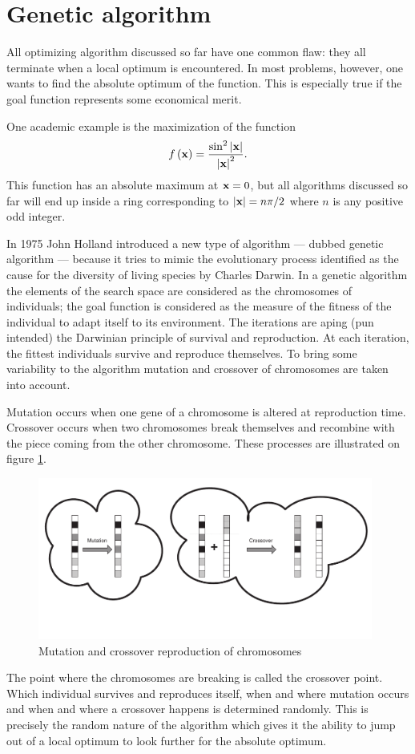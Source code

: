 \documentclass[twoside]{book}
\begin{document}
\section{Genetic algorithm}
All optimizing algorithm discussed so far have one common flaw:
they all terminate when a local optimum is encountered. In most
problems, however, one wants to find the absolute optimum of the
function. This is especially true if the goal function represents
some economical merit.

\noindent One academic example is the maximization of the function
\begin{equation}
\label{eq:geneticCase}
  f\left({\bf x}\right)={ \sin^2\left|{\bf x}\right| \over\left|{\bf
  x}\right|^2}.
\end{equation}
This function has an absolute maximum at ${\bf x}=0$, but all
algorithms discussed so far will end up inside a ring
corresponding to $\left|{\bf x}\right|=n\pi/2$ where $n$ is any
positive odd integer.

In 1975 John Holland introduced a new type of algorithm --- dubbed
genetic algorithm --- because it tries to mimic the evolutionary
process identified as the cause for the diversity of living
species by Charles Darwin. In a genetic algorithm the elements of
the search space are considered as the chromosomes of individuals;
the goal function is considered as the measure of the fitness of
the individual to adapt itself to its
environment\cite{BerLin}\cite{Koza}. The iterations are aping (pun
intended) the Darwinian principle of survival and reproduction. At
each iteration, the fittest individuals survive and reproduce
themselves. To bring some variability to the algorithm mutation
and crossover of chromosomes are taken into account.

Mutation occurs when one gene of a chromosome is altered at
reproduction time. Crossover occurs when two chromosomes break
themselves and recombine with the piece coming from the other
chromosome. These processes are illustrated on figure
\ref{fig:crossover}.
\begin{figure}
\centering\includegraphics[width=11cm]{Figures/Crossover}
\caption{Mutation and crossover reproduction of
chromosomes}\label{fig:crossover}
\end{figure}
The point where the chromosomes are breaking is called the
crossover point. Which individual survives and reproduces itself,
when and where mutation occurs and when and where a crossover
happens is determined randomly. This is precisely the random
nature of the algorithm which gives it the ability to jump out of
a local optimum to look further for the absolute optimum.
\end{document}
